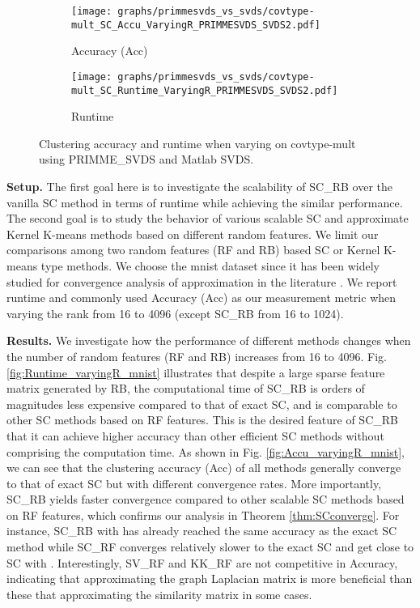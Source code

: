 \documentclass[sigconf]{acmart}
\newcommand{\1}{\boldsymbol{1}}
\newcommand{\0}{\boldsymbol{0}}
\begin{document}
\begin{figure}[!htb]
\centering
	  \begin{subfigure}[b]{0.23\textwidth}
      \texttt{[image: graphs/primmesvds\_vs\_svds/covtype-mult\_SC\_Accu\_VaryingR\_PRIMMESVDS\_SVDS2.pdf]}
      \caption{Accuracy (Acc)}
      \label{fig:Accu_varyingR_covtype-mult}
      \end{subfigure}
	  \begin{subfigure}[b]{0.23\textwidth}
      \texttt{[image: graphs/primmesvds\_vs\_svds/covtype-mult\_SC\_Runtime\_VaryingR\_PRIMMESVDS\_SVDS2.pdf]}
      \caption{Runtime}
      \label{fig:Runtime_varyingR_covtype-mult}
      \end{subfigure}
\caption{Clustering accuracy and runtime when varying  on covtype-mult using PRIMME\_SVDS and Matlab SVDS.}
 \vspace{0mm}
\label{fig:Accu_runtime_varyingR_covtype-mult}
\end{figure}

\textbf{Setup.} 
The first goal here is to investigate the scalability of SC\_RB over the vanilla SC method in terms of runtime while achieving the similar performance. The second goal is to study the behavior of various scalable SC and approximate Kernel K-means methods based on different random features. We limit our comparisons among two random features (RF and RB) based SC or Kernel K-means type methods.  
We choose the mnist dataset since it has been widely studied for  convergence analysis of approximation in the literature \cite{chitta2012efficient,chen2011large,li2016scalable}. We report runtime and commonly used Accuracy (Acc) as our measurement metric when varying the rank  from 16 to 4096 (except SC\_RB from 16 to 1024).

\textbf{Results.}
We investigate how the performance of different methods changes when the number  of random features (RF and RB) increases from 16 to 4096. 
Fig. \ref{fig:Runtime_varyingR_mnist} illustrates that despite a large sparse feature matrix generated by RB, the computational time of SC\_RB is orders of magnitudes less expensive compared to that of exact SC, and is comparable to other SC methods based on RF features. This is the desired feature of SC\_RB that it can achieve higher accuracy than other efficient SC methods without comprising the computation time. 
As shown in Fig. \ref{fig:Accu_varyingR_mnist}, we can see that the clustering accuracy (Acc) of all methods generally converge to that of exact SC but with different convergence rates. More importantly, SC\_RB yields faster convergence compared to other scalable SC methods based on RF features, which confirms our analysis in Theorem \ref{thm:SCconverge}. For instance, SC\_RB with  has already reached the same accuracy as the exact SC method while SC\_RF converges relatively slower to the exact SC and get close to SC with . Interestingly, SV\_RF and KK\_RF are not competitive in Accuracy, indicating that approximating the graph Laplacian matrix  is more beneficial than these that approximating the similarity matrix  in some cases.
\end{document}
